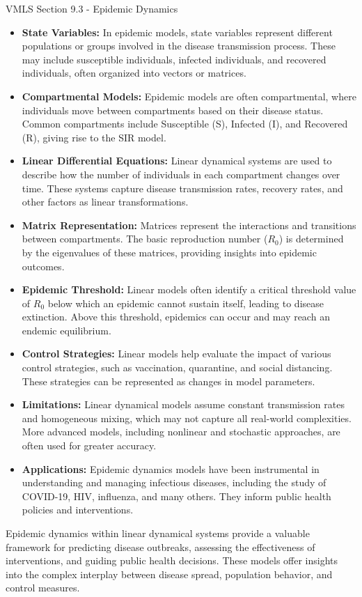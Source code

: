 \begin{notes}{VMLS Section 9.3 - Epidemic Dynamics}
    \begin{itemize}
        \item \textbf{State Variables:} In epidemic models, state variables represent different populations or groups involved in the disease transmission process. These may include susceptible 
        individuals, infected individuals, and recovered individuals, often organized into vectors or matrices.
        \item \textbf{Compartmental Models:} Epidemic models are often compartmental, where individuals move between compartments based on their disease status. Common compartments include 
        Susceptible (S), Infected (I), and Recovered (R), giving rise to the SIR model.
        \item \textbf{Linear Differential Equations:} Linear dynamical systems are used to describe how the number of individuals in each compartment changes over time. These systems capture 
        disease transmission rates, recovery rates, and other factors as linear transformations.
        \item \textbf{Matrix Representation:} Matrices represent the interactions and transitions between compartments. The basic reproduction number (\(R_0\)) is determined by the eigenvalues of 
        these matrices, providing insights into epidemic outcomes.
        \item \textbf{Epidemic Threshold:} Linear models often identify a critical threshold value of \(R_0\) below which an epidemic cannot sustain itself, leading to disease extinction. Above 
        this threshold, epidemics can occur and may reach an endemic equilibrium.
        \item \textbf{Control Strategies:} Linear models help evaluate the impact of various control strategies, such as vaccination, quarantine, and social distancing. These strategies can be 
        represented as changes in model parameters.
        \item \textbf{Limitations:} Linear dynamical models assume constant transmission rates and homogeneous mixing, which may not capture all real-world complexities. More advanced models, 
        including nonlinear and stochastic approaches, are often used for greater accuracy.
        \item \textbf{Applications:} Epidemic dynamics models have been instrumental in understanding and managing infectious diseases, including the study of COVID-19, HIV, influenza, and many 
        others. They inform public health policies and interventions.
    \end{itemize}

    Epidemic dynamics within linear dynamical systems provide a valuable framework for predicting disease outbreaks, assessing the effectiveness of interventions, and guiding public health decisions. 
    These models offer insights into the complex interplay between disease spread, population behavior, and control measures.
\end{notes}


